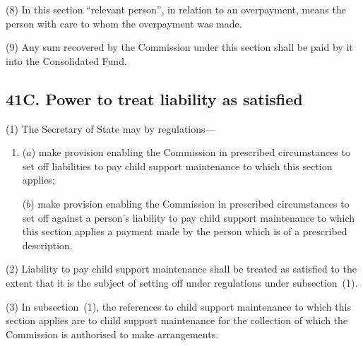 \documentclass[12pt,a4paper]{article}
\begin{document}
(8) In this section “relevant person”, in relation to an overpayment, means the person with care to whom the overpayment was made.

(9) Any sum recovered by the 
Commission  %
under this section shall be paid by 
it  %
into the Consolidated Fund.


\subsection{41C. Power to treat liability as satisfied}

(1) The Secretary of State may by regulations---
\begin{enumerate}\item[]
($a$) make provision enabling the Commission in prescribed circumstances to set off liabilities to pay child support maintenance to which this section applies;

($b$) make provision enabling the Commission in prescribed circumstances to set off against a person’s liability to pay child support maintenance to which this section applies a payment made by the person which is of a prescribed description.
\end{enumerate}

(2)
Liability to pay child support maintenance shall be treated as satisfied to the extent that it is the subject of setting off under regulations under subsection~(1).

(3)
In subsection~(1), the references to child support maintenance to which this section applies are to child support maintenance for the collection of which the Commission is authorised to make arrangements.

\end{document}
